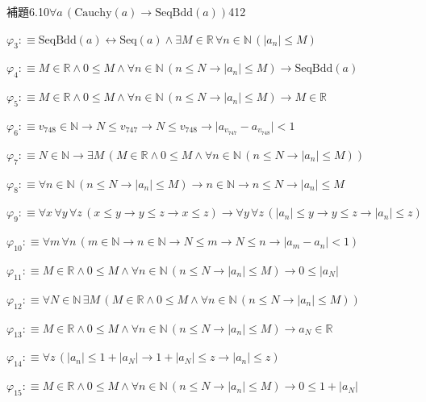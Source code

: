 \begin{fullproof}{補題6.10}{$\forall a\,(\mathrm{Cauchy}(a) \to \mathrm{SeqBdd}(a))$}{412}
\begin{abbrevlist}
\item $\varphi_{3} :\equiv \mathrm{SeqBdd}(a) \leftrightarrow \mathrm{Seq}(a) \land \exists M \in \mathbb{R}\,\forall n \in \mathbb{N}\,(\lvert a_{n} \rvert \leq M)$
\item $\varphi_{4} :\equiv M \in \mathbb{R} \land 0 \leq M \land \forall n \in \mathbb{N}\,(n \leq N \to \lvert a_{n} \rvert \leq M) \to \mathrm{SeqBdd}(a)$
\item $\varphi_{5} :\equiv M \in \mathbb{R} \land 0 \leq M \land \forall n \in \mathbb{N}\,(n \leq N \to \lvert a_{n} \rvert \leq M) \to M \in \mathbb{R}$
\item $\varphi_{6} :\equiv v_{748} \in \mathbb{N} \to N \leq v_{747} \to N \leq v_{748} \to \lvert a_{v_{747}} - a_{v_{748}} \rvert < 1$
\item $\varphi_{7} :\equiv N \in \mathbb{N} \to \exists M\,(M \in \mathbb{R} \land 0 \leq M \land \forall n \in \mathbb{N}\,(n \leq N \to \lvert a_{n} \rvert \leq M))$
\item $\varphi_{8} :\equiv \forall n \in \mathbb{N}\,(n \leq N \to \lvert a_{n} \rvert \leq M) \to n \in \mathbb{N} \to n \leq N \to \lvert a_{n} \rvert \leq M$
\item $\varphi_{9} :\equiv \forall x\,\forall y\,\forall z\,(x \leq y \to y \leq z \to x \leq z) \to \forall y\,\forall z\,(\lvert a_{n} \rvert \leq y \to y \leq z \to \lvert a_{n} \rvert \leq z)$
\item $\varphi_{10} :\equiv \forall m\,\forall n\,(m \in \mathbb{N} \to n \in \mathbb{N} \to N \leq m \to N \leq n \to \lvert a_{m} - a_{n} \rvert < 1)$
\item $\varphi_{11} :\equiv M \in \mathbb{R} \land 0 \leq M \land \forall n \in \mathbb{N}\,(n \leq N \to \lvert a_{n} \rvert \leq M) \to 0 \leq \lvert a_{N} \rvert$
\item $\varphi_{12} :\equiv \forall N \in \mathbb{N}\,\exists M\,(M \in \mathbb{R} \land 0 \leq M \land \forall n \in \mathbb{N}\,(n \leq N \to \lvert a_{n} \rvert \leq M))$
\item $\varphi_{13} :\equiv M \in \mathbb{R} \land 0 \leq M \land \forall n \in \mathbb{N}\,(n \leq N \to \lvert a_{n} \rvert \leq M) \to a_{N} \in \mathbb{R}$
\item $\varphi_{14} :\equiv \forall z\,(\lvert a_{n} \rvert \leq 1 + \lvert a_{N} \rvert \to 1 + \lvert a_{N} \rvert \leq z \to \lvert a_{n} \rvert \leq z)$
\item $\varphi_{15} :\equiv M \in \mathbb{R} \land 0 \leq M \land \forall n \in \mathbb{N}\,(n \leq N \to \lvert a_{n} \rvert \leq M) \to 0 \leq 1 + \lvert a_{N} \rvert$

\end{abbrevlist}
\end{fullproof}
